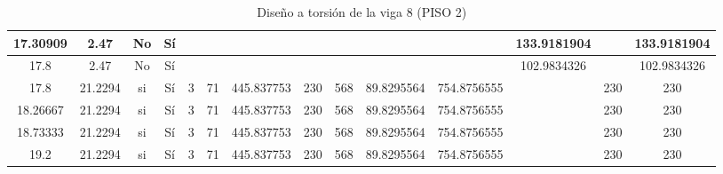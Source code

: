 \begin{table}[H]
{\begin{tabular}{|c|c|c|c|c|c|c|c|c|c|c|c|c|c|}
\hline
17.30909 & 2.47 & No  & Sí  &     &     &     &     &     &     &     & 133.9181904 &     & 133.9181904 \bigstrut\\
\hline
17.8 & 2.47 & No  & Sí  &     &     &     &     &     &     &     & 102.9834326 &     & 102.9834326 \bigstrut\\
\hline
17.8 & 21.2294 & si  & Sí  & 3   & 71  & 445.837753 & 230 & 568 & 89.8295564 & 754.8756555 &     & 230 & 230 \bigstrut\\
\hline
18.26667 & 21.2294 & si  & Sí  & 3   & 71  & 445.837753 & 230 & 568 & 89.8295564 & 754.8756555 &     & 230 & 230 \bigstrut\\
\hline
18.73333 & 21.2294 & si  & Sí  & 3   & 71  & 445.837753 & 230 & 568 & 89.8295564 & 754.8756555 &     & 230 & 230 \bigstrut\\
\hline
19.2 & 21.2294 & si  & Sí  & 3   & 71  & 445.837753 & 230 & 568 & 89.8295564 & 754.8756555 &     & 230 & 230 \bigstrut\\
\hline
\end{tabular}%


%
  }
      \caption{Diseño a torsión de la viga 8 (PISO 2) }
  \label{tab:T VG8 P2 }%
\end{table}%
